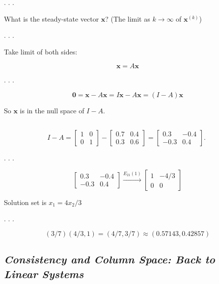\documentclass[
  letterpaper,
  DIV=11,
  numbers=noendperiod]{scrartcl}
\begin{document}
. . .

What is the steady-state vector \(\mathbf{x}\)? (The limit as
\(k \rightarrow \infty\) of \(\mathbf{x}^{(k)}\))

. . .

Take limit of both sides:

\[
\mathbf{x}=A \mathbf{x}
\]

. . .

\[
\mathbf{0}=\mathbf{x}-A \mathbf{x}=I \mathbf{x}-A \mathbf{x}=(I-A) \mathbf{x}
\]

So \(\mathbf{x}\) is in the null space of \(I-A\).

\subsection{\texorpdfstring{\emph{}}{}}\label{section-5}

\[
I-A=\left[\begin{array}{ll}
1 & 0 \\
0 & 1
\end{array}\right]-\left[\begin{array}{ll}
0.7 & 0.4 \\
0.3 & 0.6
\end{array}\right]=\left[\begin{array}{rr}
0.3 & -0.4 \\
-0.3 & 0.4
\end{array}\right] \text {. }
\]

. . .

\[
\left[\begin{array}{rr}
0.3 & -0.4 \\
-0.3 & 0.4
\end{array}\right] \xrightarrow{E_{21}(1)}\left[\begin{array}{rr}
1 & -4 / 3 \\
0 & 0
\end{array}\right]
\]

Solution set is \(x_{1}=4 x_{2} / 3\)

. . .

\[
(3 / 7)(4 / 3,1)=(4 / 7,3 / 7) \approx(0.57143,0.42857)
\]

\subsection{\texorpdfstring{\emph{Consistency and Column Space: Back to
Linear
Systems}}{Consistency and Column Space: Back to Linear Systems}}\label{consistency-and-column-space-back-to-linear-systems}
\end{document}
